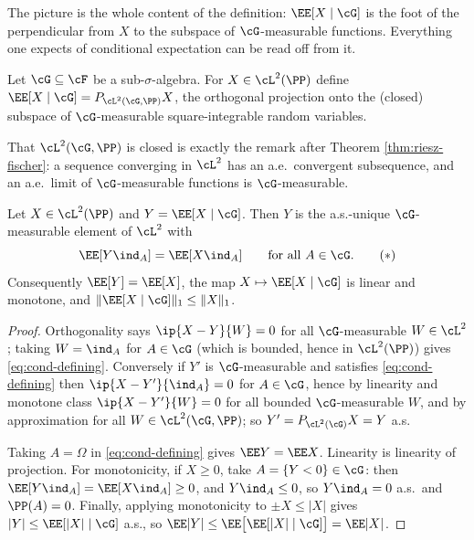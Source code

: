 The picture is the whole content of the definition: $\EE[X\mid\cG]$ is the foot of the perpendicular from $X$ to the subspace of $\cG$-measurable functions. Everything one expects of conditional expectation can be read off from it.

\begin{definition}
	Let $\cG \subseteq \cF$ be a sub-$\sigma$-algebra. For $X \in \cL^2(\PP)$ define $\EE[X\mid\cG] = P_{\cL^2(\cG,\PP)}X$, the orthogonal projection onto the (closed) subspace of $\cG$-measurable square-integrable random variables.
\end{definition}

That $\cL^2(\cG,\PP)$ is closed is exactly the remark after Theorem \ref{thm:riesz-fischer}: a sequence converging in $\cL^2$ has an a.e.\ convergent subsequence, and an a.e.\ limit of $\cG$-measurable functions is $\cG$-measurable.

\begin{proposition}\label{prop:cond-props}
	Let $X \in \cL^2(\PP)$ and $Y = \EE[X\mid\cG]$. Then $Y$ is the a.s.-unique $\cG$-measurable element of $\cL^2$ with
	\begin{equation}\label{eq:cond-defining}
		\EE[Y \ind_A] = \EE[X\ind_A] \qquad \text{for all } A \in \cG. \tag{$\ast$}
	\end{equation}
	Consequently $\EE[Y]=\EE[X]$, the map $X \mapsto \EE[X\mid\cG]$ is linear and monotone, and $\|\EE[X\mid\cG]\|_1 \leq \|X\|_1$.
\end{proposition}
\begin{proof}
	Orthogonality says $\ip{X-Y}{W}=0$ for all $\cG$-measurable $W \in \cL^2$; taking $W = \ind_A$ for $A \in \cG$ (which is bounded, hence in $\cL^2(\PP)$) gives \eqref{eq:cond-defining}. Conversely if $Y'$ is $\cG$-measurable and satisfies \eqref{eq:cond-defining} then $\ip{X-Y'}{\ind_A}=0$ for $A \in \cG$, hence by linearity and monotone class $\ip{X-Y'}{W}=0$ for all bounded $\cG$-measurable $W$, and by approximation for all $W \in \cL^2(\cG,\PP)$; so $Y'=P_{\cL^2(\cG)}X = Y$ a.s.

	Taking $A = \Omega$ in \eqref{eq:cond-defining} gives $\EE Y = \EE X$. Linearity is linearity of projection. For monotonicity, if $X \geq 0$, take $A = \{Y<0\} \in \cG$: then $\EE[Y\ind_A] = \EE[X\ind_A]\geq 0$, and $Y\ind_A \leq 0$, so $Y\ind_A = 0$ a.s.\ and $\PP(A)=0$. Finally, applying monotonicity to $\pm X \leq |X|$ gives $|Y| \leq \EE[|X| \mid \cG]$ a.s., so $\EE|Y| \leq \EE\big[\EE[|X|\mid\cG]\big] = \EE|X|$.
\end{proof}

